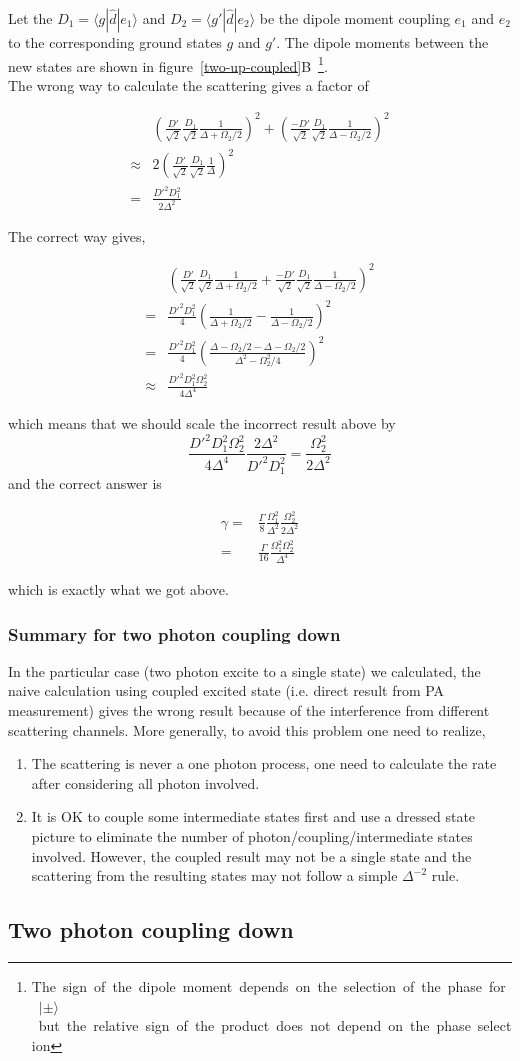 \documentclass[10pt,fleqn]{article}
\newcommand{\eqar}[1]
{
  \begin{align*}
    #1
  \end{align*}
}
\newcommand{\paren}[1]{{\left({#1}\right)}}
\begin{document}
Let the $D_1=\langle g|\hat d|e_1\rangle$ and $D_2=\langle g'|\hat d|e_2\rangle$ be
the dipole moment coupling $e_1$ and $e_2$ to the corresponding ground states $g$ and $g'$.
The dipole moments between the new states are shown in \mbox{figure \ref{two-up-coupled}B
\footnote{The sign of the dipole moment depends on the selection of the phase for
  $|\pm\rangle$ but the relative sign of the product does not depend on the phase selection}.}\\

The wrong way to calculate the scattering gives a factor of
\eqar{
  &\paren{\frac{D'}{\sqrt2}\frac{D_1}{\sqrt2}\frac{1}{\Delta+\Omega_2/2}}^2+\paren{\frac{-D'}{\sqrt2}\frac{D_1}{\sqrt2}\frac{1}{\Delta-\Omega_2/2}}^2\\
  \approx&2\paren{\frac{D'}{\sqrt2}\frac{D_1}{\sqrt2}\frac{1}{\Delta}}^2\\
  =&\frac{D'^2D_1^2}{2\Delta^2}
}
The correct way gives,
\eqar{
  &\paren{\frac{D'}{\sqrt2}\frac{D_1}{\sqrt2}\frac{1}{\Delta+\Omega_2/2}+\frac{-D'}{\sqrt2}\frac{D_1}{\sqrt2}\frac{1}{\Delta-\Omega_2/2}}^2\\
  =&\frac{D'^2D_1^2}{4}\paren{\frac{1}{\Delta+\Omega_2/2}-\frac{1}{\Delta-\Omega_2/2}}^2\\
  =&\frac{D'^2D_1^2}{4}\paren{\frac{\Delta-\Omega_2/2-\Delta-\Omega_2/2}{\Delta^2-\Omega_2^2/4}}^2\\
  \approx&\frac{D'^2D_1^2\Omega_2^2}{4\Delta^4}
}
which means that we should scale the incorrect result above by
\[\frac{D'^2D_1^2\Omega_2^2}{4\Delta^4}\frac{2\Delta^2}{D'^2D_1^2}=\frac{\Omega_2^2}{2\Delta^2}\]
and the correct answer is
\eqar{
  \gamma=&\frac{\Gamma}{8}\frac{\Omega_1^2}{\Delta^2}\frac{\Omega_2^2}{2\Delta^2}\\
  =&\frac{\Gamma}{16}\frac{\Omega_1^2\Omega_2^2}{\Delta^4}
}
which is exactly what we got above.

\subsubsection{Summary for two photon coupling down}

In the particular case (two photon excite to a single state) we calculated,
the naive calculation using coupled excited state (i.e. direct result from PA measurement)
gives the wrong result because of the interference from different scattering channels.
More generally, to avoid this problem one need to realize,
\begin{enumerate}
\item The scattering is never a one photon process, one need to calculate the rate
  after considering all photon involved.
\item It is OK to couple some intermediate states first and use a dressed state picture
  to eliminate the number of photon/coupling/intermediate states involved. However,
  the coupled result may not be a single state and the scattering from the resulting
  states may not follow a simple $\Delta^{-2}$ rule.
\end{enumerate}

\subsection{Two photon coupling down}

\end{document}

